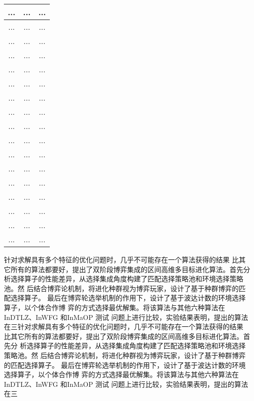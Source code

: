 \begin{center}
\begin{longtable}{ccc}
	\midrule 
	...    &  ...                   &    ...\\
	\midrule
	...     &  ...                   &    ...\\
	\midrule 
	...    &  ...                   &    ...\\
	\midrule 
	...     &  ...                  &    ...\\
	\midrule
	...     &  ...                   &    ...\\
	\midrule 
	...    &  ...                   &    ...\\
	\midrule 
	...     &  ...                  &    ...\\ 
	\midrule
	...     &  ...                   &    ...\\
	\midrule 
	...    &  ...                   &    ...\\
	\midrule
	...     &  ...                   &    ...\\
	\midrule 
	...    &  ...                   &    ...\\
	\midrule 
	...     &  ...                  &    ...\\
	\midrule
	...     &  ...                   &    ...\\
	\midrule 
	...    &  ...                   &    ...\\
	\midrule 
	...     &  ...                  &    ...\\ 
	\midrule
	...     &  ...                   &    ...\\
	\midrule 
	...    &  ...                   &    ...\\
	\bottomrule
\end{longtable}
\end{center}
\vspace{-2em}
针对求解具有多个特征的优化问题时，几乎不可能存在一个算法获得的结果
比其它所有的算法都要好，提出了双阶段博弈集成的区间高维多目标进化算法。首先分
析选择算子的性能差异，从选择集成角度构建了匹配选择策略池和环境选择策略池。然
后结合博弈论机制，将进化种群视为博弈玩家，设计了基于种群博弈的匹配选择算子。
最后在博弈轮选举机制的作用下，设计了基于波达计数的环境选择算子，以个体合作博
弈的方式选择最优解集。将该算法与其他六种算法在InDTLZ、InWFG 和InMaOP 测试
问题上进行比较，实验结果表明，提出的算法在三针对求解具有多个特征的优化问题时，几乎不可能存在一个算法获得的结果
比其它所有的算法都要好，提出了双阶段博弈集成的区间高维多目标进化算法。首先分
析选择算子的性能差异，从选择集成角度构建了匹配选择策略池和环境选择策略池。然
后结合博弈论机制，将进化种群视为博弈玩家，设计了基于种群博弈的匹配选择算子。
最后在博弈轮选举机制的作用下，设计了基于波达计数的环境选择算子，以个体合作博
弈的方式选择最优解集。将该算法与其他六种算法在InDTLZ、InWFG 和InMaOP 测试
问题上进行比较，实验结果表明，提出的算法在三
